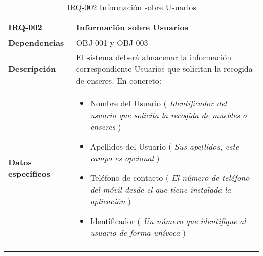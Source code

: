 \begin{center}
\begin{longtable}{|p{80pt}|p{9cm}|}
\hline
\textbf{IRQ-002} & Información sobre Usuarios \\ \hline
\textbf{Dependencias} & OBJ-001 y OBJ-003 \\ \hline
\textbf{Descripción} & El sistema deberá almacenar la información correspondiente Usuarios que solicitan la recogida de enseres. En concreto: \\ \hline
\textbf{Datos \mbox{específicos}} & 
\begin{itemize}
    \item Nombre del Usuario ( \textit{Identificador del usuario que solicita la recogida de muebles o enseres} )
    \item Apellidos del Usuario ( \textit{Sus apellidos, este campo es opcional} )
    \item Teléfono de contacto ( \textit{El número de teléfono del móvil desde el que tiene instalada la aplicación} )
    \item Identificador ( \textit{Un número que identifique al usuario de forma unívoca} )
\end{itemize}\\ \hline
\caption{IRQ-002  Información sobre Usuarios}
\end{longtable}
\end{center}
